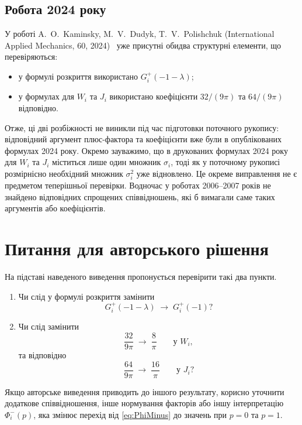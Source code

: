 \documentclass[12pt,a4paper]{article}
\begin{document}
\subsection*{Робота 2024 року}

У роботі A.~O.~Kaminsky, M.~V.~Dudyk, T.~V.~Polishchuk
(International Applied Mechanics, 60, 2024)~\cite{Kaminsky2024}
уже присутні обидва структурні елементи, що перевіряються:
\begin{itemize}
  \item у формулі розкриття використано
  $G_i^+(-1-\lambda)$;
  \item у формулах для $W_i$ та $J_i$ використано коефіцієнти
  $32/(9\pi)$ та $64/(9\pi)$ відповідно.
\end{itemize}

Отже, ці дві розбіжності не виникли під час підготовки поточного
рукопису: відповідний аргумент плюс-фактора та коефіцієнти вже
були в опублікованих формулах 2024 року. Окремо зауважимо, що
в друкованих формулах 2024 року для $W_i$ та $J_i$ міститься
лише один множник $\sigma_i$, тоді як у поточному рукописі
розмірнісно необхідний множник $\sigma_i^2$ уже відновлено.
Це окреме виправлення не є предметом теперішньої перевірки.
Водночас у роботах 2006--2007 років не знайдено відповідних
спрощених співвідношень, які б вимагали саме таких аргументів
або коефіцієнтів.

\section{Питання для авторського рішення}

На підставі наведеного виведення пропонується перевірити такі два
пункти.

\begin{enumerate}
  \item Чи слід у формулі розкриття замінити
  \[
    \boxed{
    G_i^+(-1-\lambda)\;\longrightarrow\;G_i^+(-1)
    }?
  \]

  \item Чи слід замінити
  \[
    \boxed{
    \frac{32}{9\pi}\;\longrightarrow\;\frac{8}{\pi}
    }
    \qquad\text{у }W_i,
  \]
  та відповідно
  \[
    \boxed{
    \frac{64}{9\pi}\;\longrightarrow\;\frac{16}{\pi}
    }
    \qquad\text{у }J_i?
  \]
\end{enumerate}

Якщо авторське виведення приводить до іншого результату, корисно
уточнити додаткове співвідношення, інше нормування факторів або іншу
інтерпретацію $\Phi_i^-(p)$, яка змінює перехід від
\eqref{eq:PhiMinus} до значень при $p=0$ та $p=1$.
\end{document}
